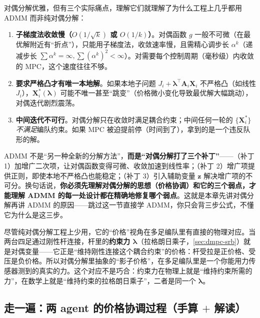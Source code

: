 对偶分解优雅，但有三个实际痛点，理解它们就理解了为什么工程上几乎都用 ADMM 而非纯对偶分解：
\begin{enumerate}
  \item \textbf{子梯度法收敛慢（$O(1/\sqrt{k})$ 或 $O(1/k)$）}。对偶函数 $g$ 一般不可微（在最优解附近有“折点”），只能用子梯度法，收敛速率慢，且需精心调步长 $\alpha^k$（递减步长 $\sum\alpha^k=\infty,\sum(\alpha^k)^2<\infty$）。对需要每个控制周期（毫秒级）内收敛的 MPC，这个速度往往不够。
  \item \textbf{要求严格凸才有唯一本地解}。如果本地子问题 $J_i+\boldsymbol{\lambda}^\top \mathbf{A}_i\mathbf{X}_i$ 不严格凸（如线性 $J_i$），$\mathbf{X}_i^*(\boldsymbol{\lambda})$ 可能不唯一甚至“跳变”（价格微小变化导致最优解大幅跳动），对偶迭代剧烈震荡。
  \item \textbf{中间迭代不可行}。对偶分解只在收敛时满足耦合约束；中间任何一轮的 $\{\mathbf{X}_i^*\}$ \emph{不满足}编队约束。如果 MPC 被迫提前停（时间到了），拿到的是一个违反队形的解。
\end{enumerate}

\begin{insight}\label{ins:dmpc-admm-patches}
ADMM 不是“另一种全新的分解方法”，\textbf{而是“对偶分解打了三个补丁”}——（补丁 1）加增广二次项，让对偶函数变得可微、收敛加速到线性率；（补丁 2）增广项提供正则，即使本地不严格凸也能稳定；（补丁 3）引入辅助变量 $\mathbf{z}$ 解决增广项的不可分。换句话说，\textbf{你必须先理解对偶分解的思想（价格协调）和它的三个弱点，才能理解 ADMM 的每一处设计都在精确地修复哪个弱点}。这就是本章先讲对偶分解再讲 ADMM 的原因——跳过这一节直接学 ADMM，你只会背三步公式，不懂它为什么是这三步。
\end{insight}

\begin{insight}[影子价格在多足里是可测的真实力]\label{ins:dmpc-shadow-force}
尽管纯对偶分解工程上少用，它的“价格”视角在多足编队里有直接的物理对应。当两台四足通过刚性杆连接，杆里的\textbf{约束力 $\boldsymbol{\lambda}$}（拉格朗日乘子，\cref{sec:dmpc-srb}）就是对偶变量——它正是“维持刚性连接这个耦合约束”的价格：杆受拉是正价格、受压是负价格。所以对偶分解里抽象的“影子价格”，在多足编队里是一个你能用力传感器测到的真实的力。这个对应不是巧合：约束力在物理上就是“维持约束所需的力”，在数学上就是“维持约束的拉格朗日乘子”，二者是同一个 $\boldsymbol{\lambda}$。
\end{insight}

\subsection{走一遍：两 agent 的价格协调过程（手算 \texorpdfstring{$+$}{+} 解读）}
\label{sec:dmpc-dual-example}

